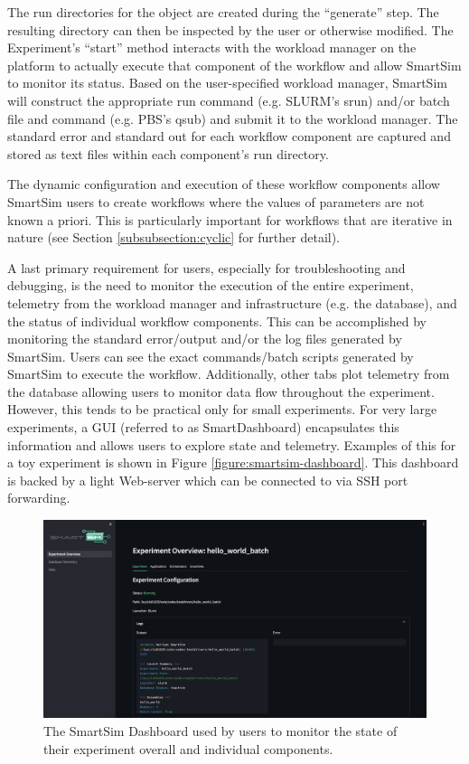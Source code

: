 \documentclass[utf8]{FrontiersinVancouver} %
\begin{document}
The run directories for the object are created during the ``generate'' step. The resulting directory can then be inspected by the user or otherwise modified. The Experiment's ``start'' method interacts with the workload manager on the platform to actually execute that component of the workflow and allow SmartSim to monitor its status. Based on the user-specified workload manager, SmartSim will construct the appropriate run command (e.g. SLURM's srun) and/or batch file and command (e.g. PBS's qsub) and submit it to the workload manager. The standard error and standard out for each workflow component are captured and stored as text files within each component's run directory.

The dynamic configuration and execution of these workflow components allow SmartSim users to create workflows where the values of parameters are not known a priori. This is particularly important for workflows that are iterative in nature (see Section \ref{subsubsection:cyclic} for further detail).

A last primary requirement for users, especially for troubleshooting and debugging, is the need to monitor the execution of the entire experiment, telemetry from the workload manager and infrastructure (e.g. the database), and the status of individual workflow components. This can be accomplished by monitoring the standard error/output and/or the log files generated by SmartSim. Users can see the exact commands/batch scripts generated by SmartSim to execute the workflow. Additionally, other tabs plot telemetry from the database allowing users to monitor data flow throughout the experiment. However, this tends to be practical only for small experiments. For very large experiments, a GUI (referred to as SmartDashboard) encapsulates this information and allows users to explore state and telemetry. Examples of this for a toy experiment is shown in Figure \ref{figure:smartsim-dashboard}. This dashboard is backed by a light Web-server which can be connected to via SSH port forwarding. 

\begin{figure}[htb]\label{figure:smartdashboard}
    \centering\includegraphics[width=0.8\columnwidth]{images/smartdashboard_experiment.png}
    \caption{The SmartSim Dashboard used by users to monitor the state of their experiment overall and individual components.}
    \label{fig:smartsim-dashboard}
\end{figure}
\end{document}
